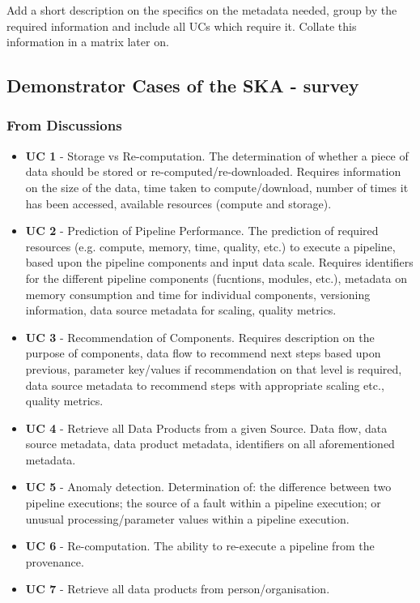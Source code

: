  

Add a short description on the specifics on the metadata needed, group by the required information and include all UCs which require it. 
Collate this information in a matrix later on. 


\subsection{Demonstrator Cases of the SKA - survey}

\subsubsection{From Discussions}
\begin{itemize}[label={}]
    \item {\bf UC 1} - Storage vs Re-computation. The determination of whether a piece of data should be stored or re-computed/re-downloaded. Requires information on the size of the data, time taken to compute/download, number of times it has been accessed, available resources (compute and storage).
    \item {\bf UC 2} - Prediction of Pipeline Performance. The prediction of required resources (e.g. compute, memory, time, quality, etc.) to execute a pipeline, based upon the pipeline components and input data scale. Requires identifiers for the different pipeline components (fucntions, modules, etc.), metadata on memory consumption and time for individual components, versioning information, data source metadata for scaling, quality metrics. 
    \item {\bf UC 3} - Recommendation of Components. Requires description on the purpose of components, data flow to recommend next steps based upon previous, parameter key/values if recommendation on that level is required, data source metadata to recommend steps with appropriate scaling etc., quality metrics.  
    \item {\bf UC 4} - Retrieve all Data Products from a given Source. Data flow, data source metadata, data product metadata, identifiers on all aforementioned metadata. 
    \item {\bf UC 5} - Anomaly detection. Determination of: the difference between two pipeline executions; the source of a fault within a pipeline execution; or unusual processing/parameter values within a pipeline execution.
    \item {\bf UC 6} - Re-computation. The ability to re-execute a pipeline from the provenance.
    \item {\bf UC 7} - Retrieve all data products from person/organisation.
\end{itemize}

